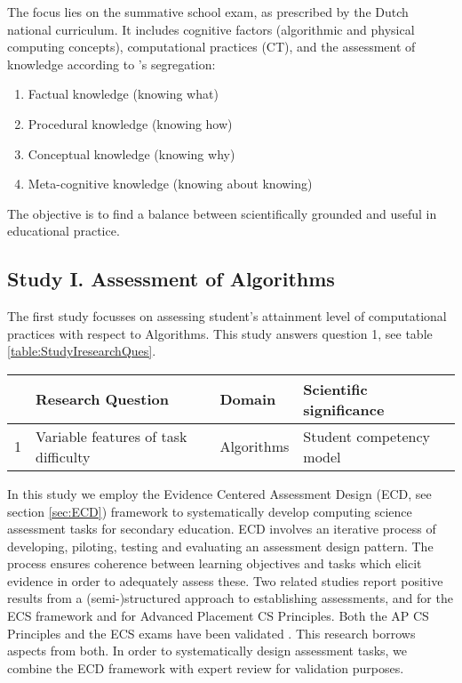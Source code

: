 The focus lies on the summative school exam, as prescribed by the Dutch national curriculum.
It includes cognitive factors (algorithmic and physical computing concepts), computational practices (CT), and the assessment of knowledge according to \citeauthor{streun2001kennis}'s segregation:
\begin{enumerate}
\item Factual knowledge (knowing what)
\item Procedural knowledge (knowing how)
\item Conceptual knowledge (knowing why)
\item Meta-cognitive knowledge (knowing about knowing)
\end{enumerate}
The objective is to find a balance between scientifically grounded and useful in educational practice.


\subsection{Study I. Assessment of Algorithms}

The first study focusses on assessing student's attainment level of computational practices with respect to Algorithms. This study answers question 1, see table \ref{table:StudyIresearchQues}.
\begin{table*}
  \centering
\begin{tabular}{|c|l|l|l|}
   \hline
    &\textbf{Research Question} & \textbf{Domain} & \textbf{Scientific significance}\\
  \hline

  1 & Variable features of task difficulty &Algorithms &Student competency model \\
  \hline
\end{tabular}
\caption{Overview study I: Assessment of Algorithms}\label{table:StudyIresearchQues}
\end{table*}


In this study we employ the Evidence Centered Assessment Design (ECD, see section \ref{sec:ECD}) framework to systematically develop computing science assessment tasks for secondary education. ECD involves an iterative process of developing, piloting, testing and evaluating an assessment design pattern. The process ensures coherence between learning objectives and tasks which elicit evidence in order to adequately assess these. Two related studies report positive results from a (semi-)structured approach to establishing assessments,  and  for the ECS framework and  for Advanced Placement CS Principles. Both the AP CS Principles and the ECS exams have been validated \cite{2010TewGuzdial}. This research borrows aspects from both. In order to systematically design assessment tasks, we combine the ECD framework with expert review for validation purposes.




